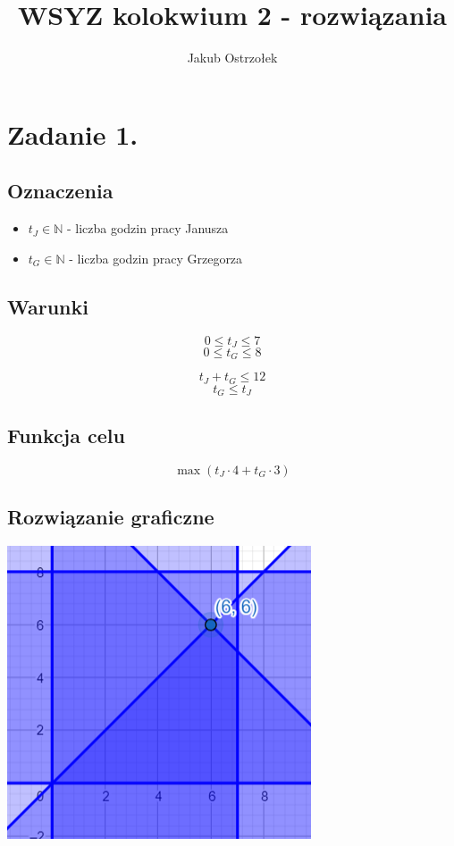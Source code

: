 \documentclass{article}
\title{WSYZ kolokwium 2 - rozwiązania}
\author{Jakub Ostrzołek}
\begin{document}
\maketitle

\section*{Zadanie 1.}

\subsection*{Oznaczenia}
\begin{itemize}
	\item $t_J \in \mathbb{N}$ - liczba godzin pracy Janusza
	\item $t_G \in \mathbb{N}$ - liczba godzin pracy Grzegorza
\end{itemize}

\subsection*{Warunki}
$$0 \le t_J \le 7$$
$$0 \le t_G \le 8$$

$$t_J + t_G \le 12$$
$$t_G \le t_J$$

\subsection*{Funkcja celu}
$$\max{(t_J \cdot 4 + t_G \cdot 3)}$$

\subsection*{Rozwiązanie graficzne}
\begin{center}
	\includegraphics{zad1.png}
\end{center}
\end{document}
